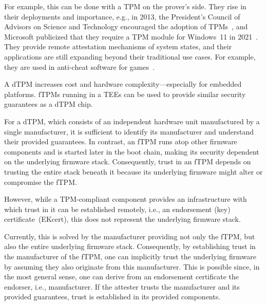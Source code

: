 
For example, this can be done with a \ac{TPM} on the prover's side. They rise in their deployments and importance, e.g., in 2013, the President's Council of Advisors on Science and Technology encouraged the adoption of TPMs~\cite{usa}, and Microsoft publicized that they require a TPM module for Windows~11 in 2021~\cite{win11req}.
They provide remote attestation mechanisms of system states, and their applications are still expanding beyond their traditional use cases. For example, they are used in anti-cheat software for games~\cite{valorant}.


A \ac{dTPM} increases cost and hardware complexity---especially for embedded platforms.
\Acp{fTPM} running in a \acp{TEE} can be used to provide similar security guarantees as a \ac{dTPM} chip.


For a \ac{dTPM}, which consists of an independent hardware unit manufactured by a single manufacturer, it is sufficient to identify its manufacturer and understand their provided guarantees.
In contrast, an \ac{fTPM} runs atop other firmware components and is started later in the boot chain, making its security dependent on the underlying firmware stack.
Consequently, trust in an \ac{fTPM} depends on trusting the entire stack beneath it because its underlying firmware might alter or compromise the \ac{fTPM}.


However, while a TPM-compliant component provides an infrastructure with which trust in it can be established remotely, i.e., an endorsement (key) certificate~(EKcert), this does not represent the underlying firmware stack.


Currently, this is solved by the manufacturer providing not only the fTPM, but also the entire underlying firmware stack.
Consequently, by establishing trust in the manufacturer of the fTPM, one can implicitly trust the underlying firmware by assuming they also originate from this manufacturer.
This is possible since, in the most general sense, one can derive from an endorsement certificate the endorser, i.e., manufacturer.
If the attester trusts the manufacturer and its provided guarantees, trust is established in its provided components.

